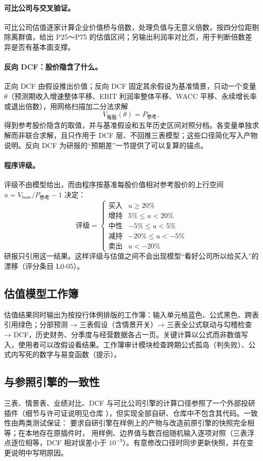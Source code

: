 \paragraph{可比公司与交叉验证。}可比公司估值逐家计算企业价值桥与倍数，处理负值与无意义倍数，按四分位距剔除离群值，给出 P25～P75 的估值区间；另输出利润率对比页，用于判断倍数差异是否有基本面支撑。

\paragraph{反向 DCF：股价隐含了什么。}正向 DCF 由假设推出价值；反向 DCF 固定其余假设为基准情景，只动一个变量 $\theta$（预测期收入增速整体平移、EBIT 利润率整体平移、WACC 平移、永续增长率或退出倍数），用网格扫描加二分法求解
\begin{equation}
  V_{\text{每股}}(\theta) = P_{\text{参考}},
\end{equation}
得到参考股价隐含的取值，并与基准假设和五年历史区间对照分档。各变量单独求解而非联合求解，且只作用于 DCF 层、不回推三表模型；这些口径简化写入产物说明。反向 DCF 为研报的“预期差”一节提供了可以复算的锚点。

\paragraph{程序评级。}评级不由模型给出，而由程序按基准每股价值相对参考股价的上行空间 $u = V_{\text{base}}/P_{\text{参考}} - 1$ 决定：
\begin{equation}
  \text{评级} = \begin{cases}
    \text{买入} & u \ge 20\%\\
    \text{增持} & 5\% \le u < 20\%\\
    \text{中性} & -5\% \le u < 5\%\\
    \text{减持} & -20\% \le u < -5\%\\
    \text{卖出} & u < -20\%
  \end{cases}
\end{equation}
研报只引用这一结果。这样评级与估值之间不会出现模型“看好公司所以给买入”的漂移（评分条目 L0-05）。

\subsection{估值模型工作簿}
估值结果同时输出为按投行体例排版的工作簿：输入单元格蓝色、公式黑色、跨表引用绿色；分部预测 → 三表假设（含情景开关）→ 三表全公式联动与勾稽检查 → DCF，历史财务、分季度与经营数据各占一页。关键计算以公式而非数值写入，使用者可以改假设看结果。工作簿审计模块检查跨期公式孤岛（判失败）、公式内写死的数字与易变函数（提示）。

\subsection{与参照引擎的一致性}
三表、情景表、业绩对比、DCF 与可比公司引擎的计算口径参照了一个外部投研插件（细节与许可证说明见仓库 ），但实现全部自研、仓库中不包含其代码。一致性由两类测试保证： 要求自研引擎在样例上的产物与改造前原引擎的快照完全相等；在本地存在原插件时， 用样例、边界值与数百组随机输入逐项对照（三表浮点逐位相等，DCF 相对误差小于 $10^{-9}$）。有意修改口径时同步更新快照，并在变更说明中写明原因。
